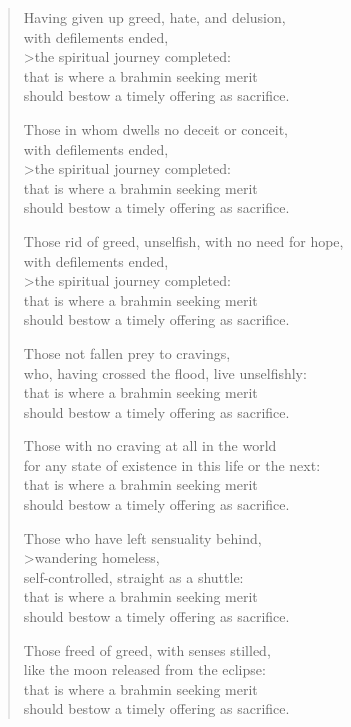 \documentclass[12pt,openany]{book}%
\begin{document}
\begin{verse}
Having given up greed, hate, and delusion, \\
with defilements ended, \\>the spiritual journey completed: \\
that is where a brahmin seeking merit \\
should bestow a timely offering as sacrifice. 

Those in whom dwells no deceit or conceit, \\
with defilements ended, \\>the spiritual journey completed: \\
that is where a brahmin seeking merit \\
should bestow a timely offering as sacrifice. 

Those rid of greed, unselfish, with no need for hope, \\
with defilements ended, \\>the spiritual journey completed: \\
that is where a brahmin seeking merit \\
should bestow a timely offering as sacrifice. 

Those not fallen prey to cravings, \\
who, having crossed the flood, live unselfishly: \\
that is where a brahmin seeking merit \\
should bestow a timely offering as sacrifice. 

Those with no craving at all in the world \\
for any state of existence in this life or the next: \\
that is where a brahmin seeking merit \\
should bestow a timely offering as sacrifice. 

Those who have left sensuality behind, \\>wandering homeless, \\
self-controlled, straight as a shuttle: \\
that is where a brahmin seeking merit \\
should bestow a timely offering as sacrifice. 

Those freed of greed, with senses stilled, \\
like the moon released from the eclipse: \\
that is where a brahmin seeking merit \\
should bestow a timely offering as sacrifice. 


\end{verse}
\end{document}

